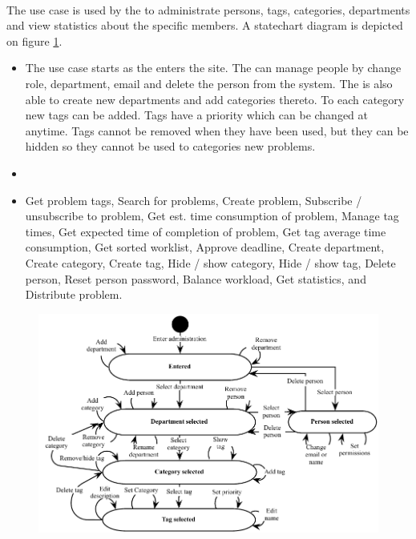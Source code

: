 \paragraph{\tucadmin[c]} The use case \tucadmin[] is used by the \sadmin[] to administrate persons, tags, categories, departments and view statistics about the specific \astaff members. A statechart diagram is depicted on figure \ref{fig:use_case_diagram}.

\begin{itemize}
\item{} The use case starts as the \sadmin{} enters the site. The \admin[] can manage people by change role, department, email and delete the person from the system. The \admin[] is also able to create new  departments and add categories thereto. To each category new tags can be added. Tags have a priority which can be changed at anytime. Tags cannot be removed when they have been used, but they can be hidden so they cannot be used to categories new problems.  

\item{} 

\item{} Get problem tags, Search for problems, Create problem, Subscribe / unsubscribe to problem, Get est. time consumption of problem, Manage tag times, Get expected time of completion of problem, Get tag average time consumption, Get sorted worklist, Approve deadline, Create department, Create category, Create tag, Hide / show category, Hide / show tag, Delete person, Reset person password, Balance workload, Get statistics, and Distribute problem. 
\end{itemize}


\begin{figure}[htbp]
\begin{center}
 \includegraphics[scale=0.8]{input/application_domain_analysis/admin_use_case}
\label{fig:use_case_diagram}
\end{center}
\end{figure}